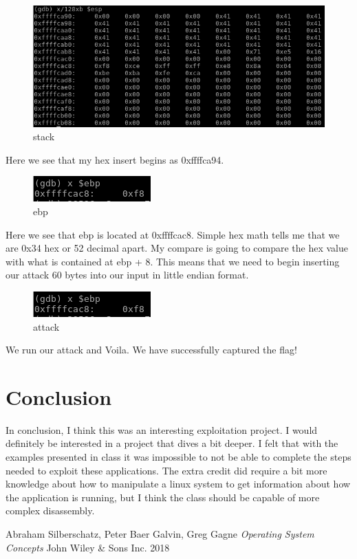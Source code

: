 \documentclass[10pt]{article}
\begin{document}
\begin{figure}[H]
\centering
\includegraphics[scale=0.5]{./images/ss22.png}
\caption{stack}
\label{fig:Code}
\end{figure}

Here we see that my hex insert begins as 0xffffca94.

\begin{figure}[H]
\centering
\includegraphics[scale=0.5]{./images/ss23.png}
\caption{ebp}
\label{fig:Code}
\end{figure}

Here we see that ebp is located at 0xffffcac8.  Simple hex math tells me that we are 0x34 hex or 52 decimal apart.  My compare is going to compare the hex value with what is contained at ebp + 8.  This means that we need to begin inserting  our attack 60 bytes into our input in little endian format.

\begin{figure}[H]
\centering
\includegraphics[scale=0.5]{./images/ss23.png}
\caption{attack}
\label{fig:Code}
\end{figure}

We run our attack and Voila.  We have successfully captured the flag!

\section{Conclusion}
In conclusion, I think this was an interesting exploitation project.  I would definitely be interested in a project that dives a bit deeper.  I felt that with the examples presented in class it was impossible to not be able to complete the steps needed to exploit these applications.  The extra credit did require a bit more knowledge about how to manipulate a linux system to get information about how the application is running, but I think the class should be capable of more complex disassembly.

\pagebreak
\begin{thebibliography}{9}
Abraham Silberschatz, Peter Baer Galvin, Greg Gagne
\textit{Operating System Concepts}
John Wiley \& Sons Inc. 2018
\end{thebibliography}
\end{document}
